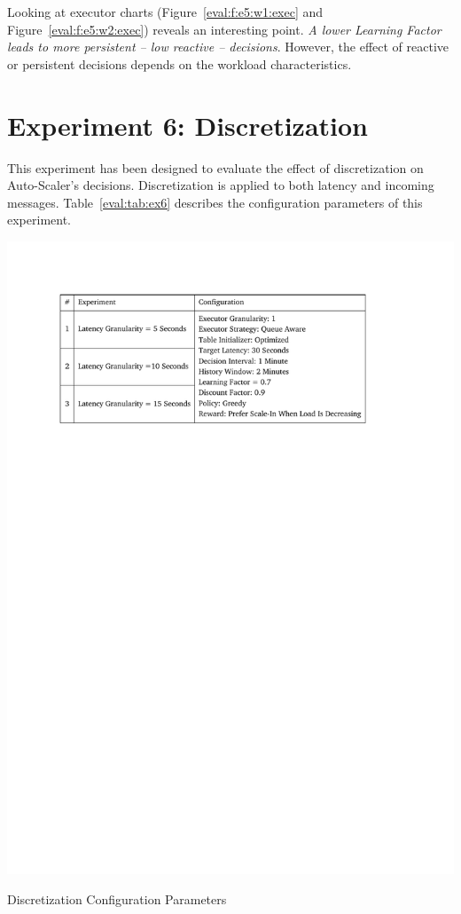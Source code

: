 Looking at executor charts (Figure~\ref{eval:f:e5:w1:exec} and Figure~\ref{eval:f:e5:w2:exec}) reveals an interesting point. \emph{A lower Learning Factor leads to more persistent -- low reactive -- decisions}. However, the effect of reactive or persistent decisions depends on the workload characteristics.
\clearpage
\section{Experiment 6: Discretization}
This experiment has been designed to evaluate the effect of discretization on Auto-Scaler's decisions. Discretization is applied to both latency and incoming messages. Table~\ref{eval:tab:ex6} describes the configuration parameters of this experiment.
\begin{table}[h]
    \includegraphics[clip,trim=2.2cm 21.18cm 3cm 2.5cm]{tables/ex6.pdf}
    \centering
    \caption{Discretization Configuration Parameters}
    \label{eval:tab:ex6}
\end{table}

